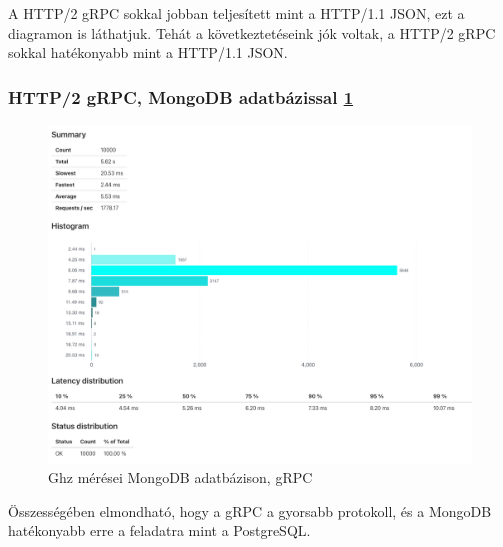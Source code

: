 \begin{remark}
    A HTTP/2 gRPC sokkal jobban teljesített mint a HTTP/1.1 JSON, ezt a diagramon is láthatjuk.
    Tehát a következtetéseink jók voltak, a HTTP/2 gRPC sokkal hatékonyabb mint a HTTP/1.1 JSON.
\end{remark}

\subsubsection{HTTP/2 gRPC, MongoDB adatbázissal \ref{fig:ghz-mongo}}
\begin{figure}[hbt!]
    \centering
    \includegraphics[scale=0.3]{images/ghz-mongo}
    \caption{Ghz mérései MongoDB adatbázison, gRPC}
    \label{fig:ghz-mongo}
\end{figure}

Összességében elmondható, hogy a gRPC a gyorsabb protokoll, és a MongoDB hatékonyabb erre a feladatra mint a PostgreSQL.



